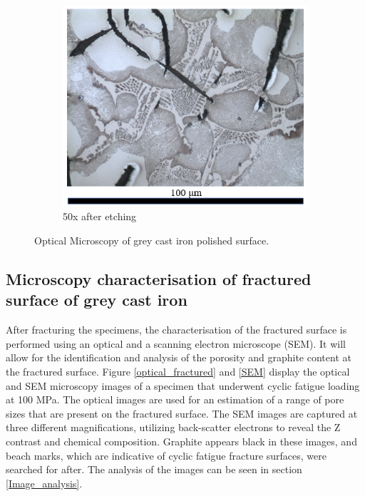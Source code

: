 \documentclass[11pt,a4paper]{article}
\begin{document}
\begin{figure} [ht]
\begin{subfigure}{0.335\textwidth}
\includegraphics[scale=0.6]{50X_05.png}
\caption{50x after etching}
\label{50_after_etching}
\end{subfigure}
\caption{Optical Microscopy of grey cast iron polished surface.}
\label{optical_side}
\end{figure}
\subsection{Microscopy characterisation of fractured surface of grey cast iron}
After fracturing the specimens, the characterisation of the fractured surface is performed using an optical and a scanning electron microscope (SEM). It will allow for the identification and analysis of the porosity and graphite content at the fractured surface. Figure \ref{optical_fractured} and \ref{SEM} display the optical and SEM microscopy images of a specimen that underwent cyclic fatigue loading at 100 MPa. The optical images are used for an estimation of a range of pore sizes that are present on the fractured surface. The SEM images are captured at three different magnifications, utilizing back-scatter electrons to reveal the Z contrast and chemical composition. Graphite appears black in these images, and beach marks, which are indicative of cyclic fatigue fracture surfaces, were searched for after. The analysis of the images can be seen in section \ref{Image_analysis}.
\end{document}
